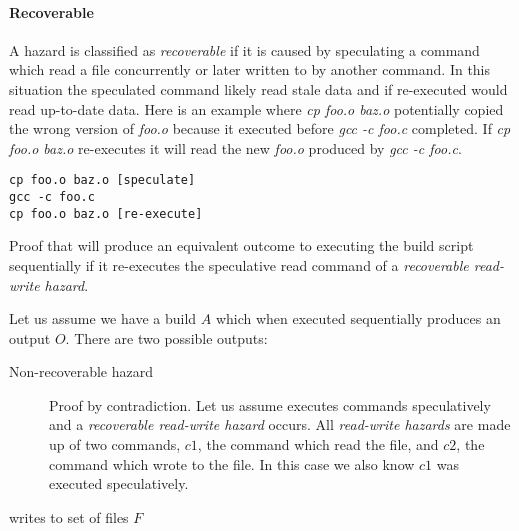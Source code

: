 \paragraph{Recoverable}
A hazard is classified as \emph{recoverable} if it is caused by \Rattle speculating a command which read a file concurrently or later written to by another command.  In this situation the speculated command likely read stale data and if re-executed would read up-to-date data.  Here is an example where \emph{cp foo.o baz.o} potentially copied the wrong version of \emph{foo.o} because it executed before \emph{gcc -c foo.c} completed.  If \emph{cp foo.o baz.o} re-executes it will read the new \emph{foo.o} produced by \emph{gcc -c foo.c}.

\begin{verbatim}
cp foo.o baz.o [speculate]
gcc -c foo.c
cp foo.o baz.o [re-execute]
\end{verbatim}

Proof that \Rattle will produce an equivalent outcome to executing the build script sequentially if it re-executes the speculative read command of a \emph{recoverable read-write hazard}.





Let us assume we have a build $A$ which when executed sequentially produces an output $O$.
There are two possible outputs:
\begin{description}
\item [Non-recoverable hazard] Proof by contradiction.
  Let us assume \Rattle executes commands speculatively and a \emph{recoverable read-write hazard} occurs.  All \emph{read-write hazards} are made up of two commands, $c1$, the command which read the file, and $c2$, the command which wrote to the file. In this case we also know $c1$ was executed speculatively.


\item [writes to set of files $F$]
\end{description}






